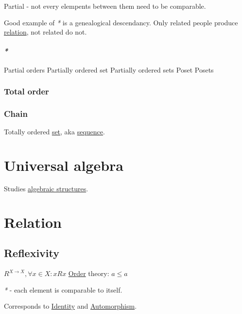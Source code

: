 \documentclass[a4paper,14pt,oneside]{book}
\begin{document}
Partial - not every elempents between them need to be comparable.

Good example of \emph{*} is a genealogical descendancy. Only related people produce \hyperref[org9291137]{relation}, not related do not.

\subsubsection{\emph{*}}
\label{sec:org0f161d1}

\label{org83c94df}Partial orders
\label{org10063c5}Partially ordered set
\label{orgc1b39bf}Partially ordered sets
\label{orga465809}Poset
\label{org03e6a81}Posets


\subsection{\label{org9f358e5}Total order}
\label{sec:orgc11fe9e}

\subsection{\label{orgfc82892}Chain}
\label{sec:org4cca704}

Totally ordered \hyperref[org6aef0c5]{set}, aka \hyperref[org26df1df]{sequence}.

\chapter{\label{orgcac0fef}Universal algebra}
\label{sec:orgd5306bc}

Studies \hyperref[org15f30f7]{algebraic structures}.

\chapter{\label{orga32ecbd}Relation}
\label{sec:org5baab43}

\section{\label{org691118e}Reflexivity}
\label{sec:org00d10b9}

\(R^{X \to X}, \forall x \in X : x R x\)
\hyperref[orgf77febb]{Order} theory: \(a \le a\)

\emph{*} - each element is comparable to itself.

Corresponds to \hyperref[org7d20a63]{Identity} and \hyperref[orga1c0812]{Automorphism}.
\end{document}
